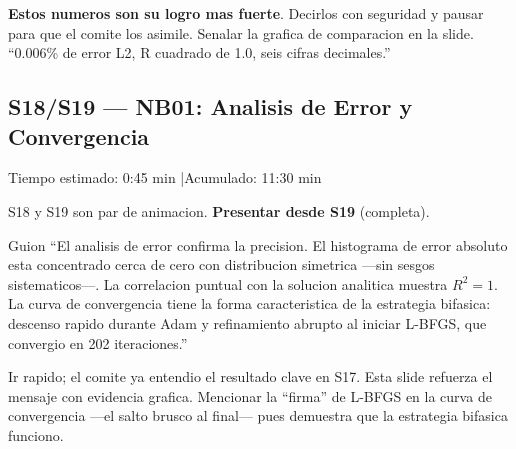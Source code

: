 \begin{tipbox}
\textbf{Estos numeros son su logro mas fuerte}. Decirlos con seguridad y pausar
para que el comite los asimile. Senalar la grafica de comparacion en la slide.
``0.006\% de error L2, R cuadrado de 1.0, seis cifras decimales.''
\end{tipbox}

\vspace{8pt}

\subsection{S18/S19 --- NB01: Analisis de Error y Convergencia}

\begin{timebox}
Tiempo estimado: 0:45 min \quad|\quad Acumulado: 11:30 min
\end{timebox}
\vspace{4pt}

\begin{warningbox}
S18 y S19 son par de animacion. \textbf{Presentar desde S19} (completa).
\end{warningbox}
\vspace{4pt}

\begin{slidebox}{Guion}
``El analisis de error confirma la precision. El histograma de error absoluto
esta concentrado cerca de cero con distribucion simetrica ---sin sesgos
sistematicos---. La correlacion puntual con la solucion analitica muestra
$R^2 = 1$. La curva de convergencia tiene la forma caracteristica de la
estrategia bifasica: descenso rapido durante Adam y refinamiento abrupto
al iniciar L-BFGS, que convergio en 202 iteraciones.''
\end{slidebox}
\vspace{4pt}

\begin{tipbox}
Ir rapido; el comite ya entendio el resultado clave en S17. Esta slide
refuerza el mensaje con evidencia grafica. Mencionar la ``firma'' de L-BFGS
en la curva de convergencia ---el salto brusco al final--- pues demuestra que
la estrategia bifasica funciono.
\end{tipbox}

\vspace{8pt}

